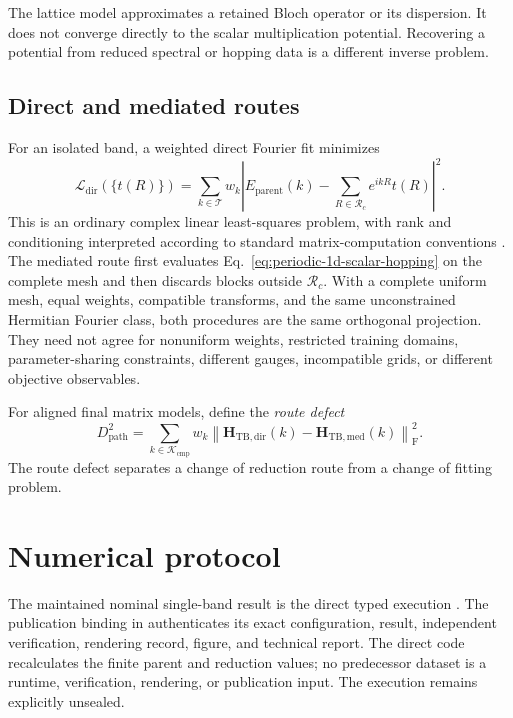 The lattice model approximates a retained Bloch operator or its dispersion. It
does not converge directly to the scalar multiplication potential. Recovering a
potential from reduced spectral or hopping data is a different inverse problem.

\subsection{Direct and mediated routes}

For an isolated band, a weighted direct Fourier fit minimizes
\begin{equation}
    \mathcal L_{\mathrm{dir}}(\{t(R)\})
    =
    \sum_{k\in\mathcal T}w_k
    \left|
        E_{\mathrm{parent}}(k)
        -\sum_{R\in\mathcal R_c}e^{ikR}t(R)
    \right|^2.
    \label{eq:periodic-1d-direct-objective}
\end{equation}
This is an ordinary complex linear least-squares problem, with rank and conditioning
interpreted according to standard matrix-computation conventions
\cite{golubVanLoan2013}. The mediated route first evaluates
Eq.~\eqref{eq:periodic-1d-scalar-hopping} on
the complete mesh and then discards blocks outside $\mathcal R_c$. With a
complete uniform mesh, equal weights, compatible transforms, and the same
unconstrained Hermitian Fourier class, both procedures are the same orthogonal
projection. They need not agree for nonuniform weights, restricted training
domains, parameter-sharing constraints, different gauges, incompatible grids,
or different objective observables.

For aligned final matrix models, define the \emph{route defect}
\begin{equation}
    D_{\mathrm{path}}^2
    =
    \sum_{k\in\mathcal K_{\mathrm{cmp}}}w_k
    \left\lVert
        \mathbf H_{\mathrm{TB,dir}}(k)
        -\mathbf H_{\mathrm{TB,med}}(k)
    \right\rVert_{\mathrm F}^2.
    \label{eq:periodic-1d-path-defect}
\end{equation}
The route defect separates a change of reduction route from a change of fitting
problem.

\section{Numerical protocol}

The maintained nominal single-band result is the direct typed execution
.
The publication binding in  authenticates its exact
configuration, result, independent verification, rendering record, figure, and technical
report. The direct code recalculates the finite parent and reduction values; no
predecessor dataset is a runtime, verification, rendering, or publication input. The
execution remains explicitly unsealed.


